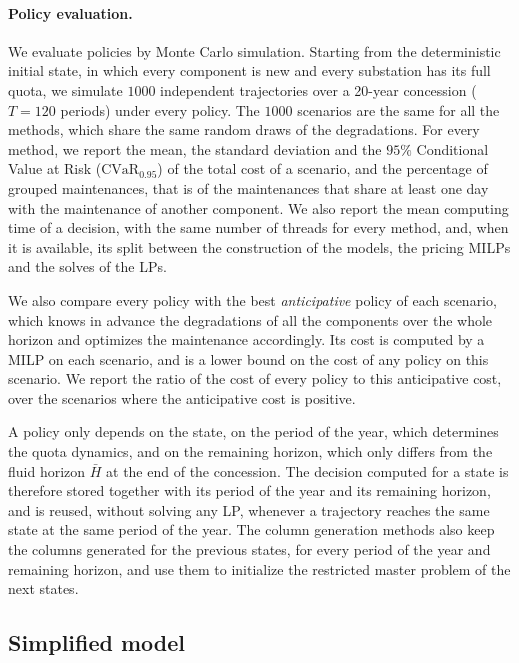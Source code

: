 \documentclass{article}
\begin{document}
\paragraph{Policy evaluation.} We evaluate policies by Monte Carlo simulation. Starting from the deterministic initial
state, in which every component is new and every substation has its full quota, we simulate $1000$ independent
trajectories over a 20-year concession ($T=120$ periods) under every policy. The $1000$ scenarios are the same for all
the methods, which share the same random draws of the degradations. For every method, we report the mean, the
standard deviation and the $95\%$ Conditional Value at Risk ($\mathrm{CVaR}_{0.95}$) of the total cost of a scenario,
and the percentage of grouped maintenances, that is of the maintenances that share at least one day with the
maintenance of another component. We also report the mean computing time of a decision, with the same number of
threads for every method, and, when it is available, its split between the construction of the models, the pricing
MILPs and the solves of the LPs.

We also compare every policy with the best \emph{anticipative} policy of each scenario, which knows in advance the
degradations of all the components over the whole horizon and optimizes the maintenance accordingly. Its cost is
computed by a MILP on each scenario, and is a lower bound on the cost of any policy on this scenario. We report the
ratio of the cost of every policy to this anticipative cost, over the scenarios where the anticipative cost is
positive.

A policy only depends on the state, on the period of the year, which determines the quota dynamics, and on the
remaining horizon, which only differs from the fluid horizon $\bar H$ at the end of the concession. The decision
computed for a state is therefore stored together with its period of the year and its remaining horizon, and is
reused, without solving any LP, whenever a trajectory reaches the same state at the same period of the year. The
column generation methods also keep the columns generated for the previous states, for every period of the year and
remaining horizon, and use them to initialize the restricted master problem of the next states.

\subsection{Simplified model}
\label{sec:simplified-model-results}
\end{document}
